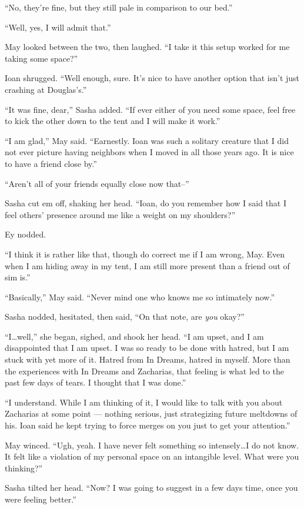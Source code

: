 ``No, they're fine, but they still pale in comparison to our bed.''

``Well, yes, I will admit that.''

May looked between the two, then laughed. ``I take it this setup worked for me taking some space?''

Ioan shrugged. ``Well enough, sure. It's nice to have another option that isn't just crashing at Douglas's.''

``It was fine, dear,'' Sasha added. ``If ever either of you need some space, feel free to kick the other down to the tent and I will make it work.''

``I am glad,'' May said. ``Earnestly. Ioan was such a solitary creature that I did not ever picture having neighbors when I moved in all those years ago. It is nice to have a friend close by.''

``Aren't all of your friends equally close now that--''

Sasha cut em off, shaking her head. ``Ioan, do you remember how I said that I feel others' presence around me like a weight on my shoulders?''

Ey nodded.

``I think it is rather like that, though do correct me if I am wrong, May. Even when I am hiding away in my tent, I am still more present than a friend out of sim is.''

``Basically,'' May said. ``Never mind one who knows me so intimately now.''

Sasha nodded, hesitated, then said, ``On that note, are \emph{you} okay?''

``I\ldots well,'' she began, sighed, and shook her head. ``I am upset, and I am disappointed that I am upset. I was so ready to be done with hatred, but I am stuck with yet more of it. Hatred from In Dreams, hatred in myself. More than the experiences with In Dreams and Zacharias, that feeling is what led to the past few days of tears. I thought that I was done.''

``I understand. While I am thinking of it, I would like to talk with you about Zacharias at some point — nothing serious, just strategizing future meltdowns of his. Ioan said he kept trying to force merges on you just to get your attention.''

May winced. ``Ugh, yeah. I have never felt something so intensely\ldots I do not know. It felt like a violation of my personal space on an intangible level. What were you thinking?''

Sasha tilted her head. ``Now? I was going to suggest in a few days time, once you were feeling better.''

